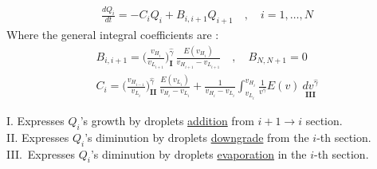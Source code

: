 \documentclass[12pt]{article}
\numberwithin{equation}{section}
\begin{document}
\begin{flushleft}
\begin{align}  \label{2_dQ_i}
\frac{d Q_i}{dt} = -C_i Q_i + B_{i, i+1} Q_{i+1} \quad , \quad i=1, \ldots, N
\end{align}
Where the general integral coefficients are :
\begin{align} 
B_{i, i+1} = \Big( \frac{v_{H_i}}{v_{L_{i+1}}} \Big)_{\textbf{I}}^{\hat{\gamma}} \, \frac{E(v_{H_i})}{v_{H_{i+1}} - v_{L_{i+1}} } \quad , \quad B_{N, N+1}=0  \label{2_B_i} \\
C_{i} = \Big( \frac{v_{H_{i-1}}}{v_{L_{i}}} \Big)^{\hat{\gamma}}_{\textbf{II}} \, \frac{E(v_{L_i})}{v_{H_{i}} - v_{L_{i}} } + \frac{1}{v_{H_{i}} - v_{L_{i}} } \int_{v_{L_i}}^{v_{H_i}} \frac{1}{v^{\hat{\gamma}}} E(v)\ \underset{\textbf{III}}{dv^{\hat{\gamma}}} \label{2_C_i}
\end{align}

I. \hspace{2.45mm} Expresses $Q_i$’s growth \hspace{5.75mm} by droplets \underline{addition} from $i + 1 \rightarrow i$ section. \\
II. \hspace{1.0mm} Expresses $Q_i$’s diminution by droplets \underline{downgrade} from the $i$-th section. \\
III.\, Expresses $Q_i$’s diminution by droplets \underline{evaporation} in the $i$-th section.


\end{flushleft}
\end{document}

